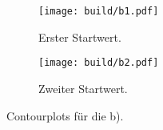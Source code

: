 \begin{figure}
  \centering
  \begin{subfigure}{0.49\textwidth}
    \centering
    \texttt{[image: build/b1.pdf]}
    \caption{Erster Startwert.}
    \label{sub:1}
  \end{subfigure}
  \begin{subfigure}{0.49\textwidth}
    \centering
    \texttt{[image: build/b2.pdf]}
    \caption{Zweiter Startwert.}
    \label{sub:2}
  \end{subfigure}
  \caption{Contourplots für die b).}
  \label{fig:2}
\end{figure}
